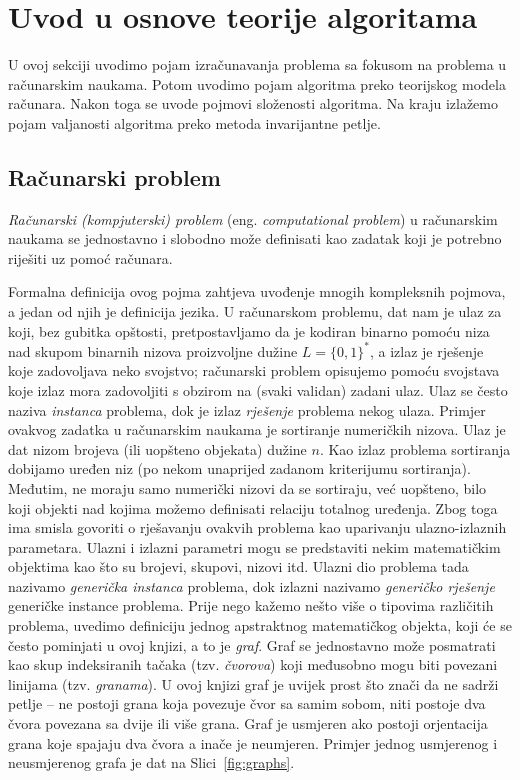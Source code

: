 \chapter{Uvod u osnove teorije algoritama}
  U ovoj sekciji uvodimo pojam izračunavanja problema sa fokusom na problema u računarskim naukama. Potom uvodimo pojam algoritma  preko teorijskog modela računara. Nakon toga se uvode pojmovi složenosti algoritma. Na kraju izlažemo pojam valjanosti algoritma preko metoda invarijantne petlje.  
   
\section{Računarski problem}

\textit{Računarski (kompjuterski) problem} (eng. \textit{computational problem}) u računa\-rskim naukama se jednostavno i slobodno može definisati kao zadatak koji je potrebno riješiti uz pomoć računara. 

Formalna definicija ovog pojma zahtjeva uvođenje mnogih kompleksnih pojmova, a jedan od njih je definicija jezika.  U računarskom problemu, dat nam je ulaz za koji, bez gubitka opštosti, pretpostavljamo da je kodiran  binarno pomoću niza nad skupom binarnih nizova proizvoljne dužine $L=\{0, 1\}^*$, a  izlaz je 
rješenje koje zadovoljava neko svojstvo; računarski problem  opisujemo  pomoću svojstava koje izlaz mora zadovoljiti s obzirom na (svaki validan) zadani ulaz. Ulaz se često naziva \textit{instanca} problema, dok je izlaz \textit{rješenje} problema nekog ulaza. Primjer ovakvog zadatka u računarskim naukama je sortiranje numeričkih nizova. Ulaz je dat nizom brojeva (ili uopšteno objekata) dužine $n$. Kao izlaz problema sortiranja dobijamo uređen niz (po nekom unaprijed zadanom kriterijumu sortiranja). Međutim, ne moraju samo numerički nizovi da se sortiraju, već uopšteno, bilo koji objekti nad kojima možemo definisati relaciju totalnog uređenja. Zbog toga ima smisla govoriti o rješavanju ovakvih problema kao 
 uparivanju ulazno-izlaznih parametara. Ulazni i izlazni parametri mogu se predstaviti nekim matematičkim objektima kao što su brojevi, skupovi, nizovi itd. Ulazni dio problema tada nazivamo \textit{generička instanca} problema, dok izlazni nazivamo  \textit{generičko rješenje} generičke instance problema.      
 Prije nego kažemo nešto više o tipovima različitih problema, uvedimo definiciju jednog apstraktnog matematičkog objekta, koji će se često pominjati u ovoj knjizi, a to je \textit{graf}. Graf se jednostavno može posmatrati kao skup indeksiranih tačaka (tzv. \textit{čvorova}) koji međusobno mogu biti povezani linijama (tzv. \textit{granama}). U ovoj knjizi graf je uvijek prost što znači da ne sadrži petlje -- ne postoji grana koja povezuje čvor sa samim sobom, niti postoje dva čvora povezana sa dvije ili više grana. Graf je usmjeren ako postoji orjentacija grana koje spajaju dva čvora a inače je neumjeren. Primjer jednog usmjerenog i neusmjerenog grafa je dat na Slici~\ref{fig:graphs}. 
 
